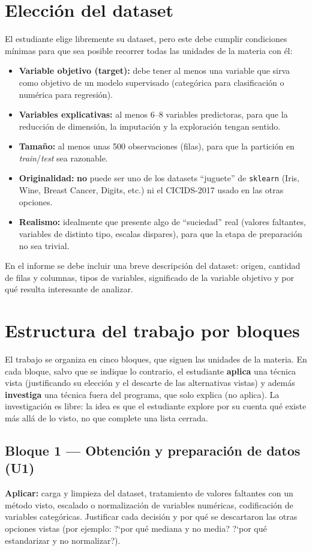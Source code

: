 \documentclass[11pt,a4paper]{article}
\newcommand{\codigo}[1]{\texttt{#1}}
\begin{document}
\section{Elecci\'on del dataset}
El estudiante elige libremente su dataset, pero este debe cumplir condiciones m\'inimas para que sea posible recorrer todas las unidades de la materia con \'el:
\begin{itemize}[leftmargin=2em,itemsep=3pt]
    \item \textbf{Variable objetivo (target):} debe tener al menos una variable que sirva como objetivo de un modelo supervisado (categ\'orica para clasificaci\'on o num\'erica para regresi\'on).
    \item \textbf{Variables explicativas:} al menos 6--8 variables predictoras, para que la reducci\'on de dimensi\'on, la imputaci\'on y la exploraci\'on tengan sentido.
    \item \textbf{Tama\~no:} al menos unas 500 observaciones (filas), para que la partici\'on en \textit{train}/\textit{test} sea razonable.
    \item \textbf{Originalidad:} \textbf{no} puede ser uno de los datasets ``juguete'' de \codigo{sklearn} (Iris, Wine, Breast Cancer, Digits, etc.) ni el CICIDS-2017 usado en las otras opciones.
    \item \textbf{Realismo:} idealmente que presente algo de ``suciedad'' real (valores faltantes, variables de distinto tipo, escalas dispares), para que la etapa de preparaci\'on no sea trivial.
\end{itemize}
En el informe se debe incluir una breve descripci\'on del dataset: origen, cantidad de filas y columnas, tipos de variables, significado de la variable objetivo y por qu\'e resulta interesante de analizar.

\section{Estructura del trabajo por bloques}
El trabajo se organiza en cinco bloques, que siguen las unidades de la materia. En cada bloque, salvo que se indique lo contrario, el estudiante \textbf{aplica} una t\'ecnica vista (justificando su elecci\'on y el descarte de las alternativas vistas) y adem\'as \textbf{investiga} una t\'ecnica fuera del programa, que solo explica (no aplica). La investigaci\'on es libre: la idea es que el estudiante explore por su cuenta qu\'e existe m\'as all\'a de lo visto, no que complete una lista cerrada.

\subsection*{Bloque 1 --- Obtenci\'on y preparaci\'on de datos (U1)}
\textbf{Aplicar:} carga y limpieza del dataset, tratamiento de valores faltantes con un m\'etodo visto, escalado o normalizaci\'on de variables num\'ericas, codificaci\'on de variables categ\'oricas. Justificar cada decisi\'on y por qu\'e se descartaron las otras opciones vistas (por ejemplo: ?`por qu\'e mediana y no media? ?`por qu\'e estandarizar y no normalizar?).
\end{document}
